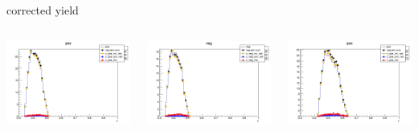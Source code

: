 \begin{frame}{corrected yield}
\begin{columns}
\begin{column}[T]{0.25\textwidth}
\includegraphics[width = \textwidth]{results/yield/statistics_corr/yield_x_Q2_z_0.35_4.000_0.40_pos.png}
\end{column}
\begin{column}[T]{0.25\textwidth}
\includegraphics[width = \textwidth]{results/yield/statistics_corr/yield_x_Q2_z_0.35_4.000_0.40_neg.png}
\end{column}
\begin{column}[T]{0.25\textwidth}
\includegraphics[width = \textwidth]{results/yield/statistics_corr/yield_x_Q2_z_0.35_4.000_0.50_pos.png}

\end{column}
\end{columns}
\end{frame}

